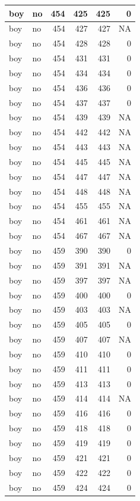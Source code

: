 \documentclass[man]{apa6}
\begin{document}
\begin{tabular}{l|l|r|r|r|r}
\hline
boy & no & 454 & 425 & 425 & 0\\
\hline
boy & no & 454 & 427 & 427 & NA\\
\hline
boy & no & 454 & 428 & 428 & 0\\
\hline
boy & no & 454 & 431 & 431 & 0\\
\hline
boy & no & 454 & 434 & 434 & 0\\
\hline
boy & no & 454 & 436 & 436 & 0\\
\hline
boy & no & 454 & 437 & 437 & 0\\
\hline
boy & no & 454 & 439 & 439 & NA\\
\hline
boy & no & 454 & 442 & 442 & NA\\
\hline
boy & no & 454 & 443 & 443 & NA\\
\hline
boy & no & 454 & 445 & 445 & NA\\
\hline
boy & no & 454 & 447 & 447 & NA\\
\hline
boy & no & 454 & 448 & 448 & NA\\
\hline
boy & no & 454 & 455 & 455 & NA\\
\hline
boy & no & 454 & 461 & 461 & NA\\
\hline
boy & no & 454 & 467 & 467 & NA\\
\hline
boy & no & 459 & 390 & 390 & 0\\
\hline
boy & no & 459 & 391 & 391 & NA\\
\hline
boy & no & 459 & 397 & 397 & NA\\
\hline
boy & no & 459 & 400 & 400 & 0\\
\hline
boy & no & 459 & 403 & 403 & NA\\
\hline
boy & no & 459 & 405 & 405 & 0\\
\hline
boy & no & 459 & 407 & 407 & NA\\
\hline
boy & no & 459 & 410 & 410 & 0\\
\hline
boy & no & 459 & 411 & 411 & 0\\
\hline
boy & no & 459 & 413 & 413 & 0\\
\hline
boy & no & 459 & 414 & 414 & NA\\
\hline
boy & no & 459 & 416 & 416 & 0\\
\hline
boy & no & 459 & 418 & 418 & 0\\
\hline
boy & no & 459 & 419 & 419 & 0\\
\hline
boy & no & 459 & 421 & 421 & 0\\
\hline
boy & no & 459 & 422 & 422 & 0\\
\hline
boy & no & 459 & 424 & 424 & 0\\

\end{tabular}
\end{document}
